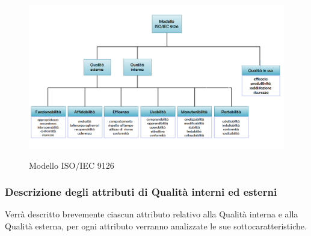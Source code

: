 \documentclass[../norme-di-progetto.tex]{subfiles}
\begin{document}
\begin{figure}[H]
    \centering
    \includegraphics[width=15cm]{img/Modello_ISO-IEC_9126.png}
    \label{fig:modello_iso_eic_9126}
    \caption{Modello ISO/IEC 9126}
\end{figure}

\subsubsection{Descrizione degli attributi di Qualità interni ed esterni}%
\label{sec:descrizione_attributi_interni_esterni}
Verrà descritto brevemente ciascun attributo relativo alla Qualità interna e alla Qualità esterna, per ogni attributo verranno analizzate le sue sottocaratteristiche.
\end{document}
